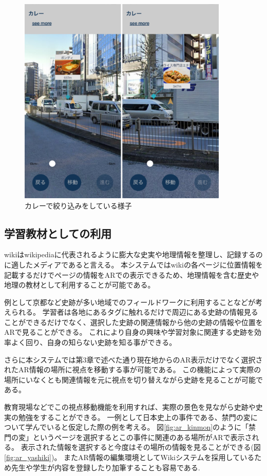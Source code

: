 \begin{figure}[h]
  \centering
  \includegraphics[width=100mm]{images/ar_navigation_jibotyo_link.png}
  \caption{カレーで絞り込みをしている様子} \label{fig:ar_navigation_jibotyo_link}
\end{figure}


\subsection{学習教材としての利用}
wikiはwikipediaに代表されるように膨大な史実や地理情報を整理し、記録するのに適したメディアであると言える。
本システムではwikiの各ページに位置情報を記載するだけでページの情報をARでの表示できるため、地理情報を含む歴史や地理の教材として利用することが可能である。

例として京都など史跡が多い地域でのフィールドワークに利用することなどが考えられる。
学習者は各地にあるタグに触れるだけで周辺にある史跡の情報見ることができるだけでなく、選択した史跡の関連情報から他の史跡の情報や位置をARで見ることができる。
これにより自身の興味や学習対象に関連する史跡を効率よく回り、自身の知らない史跡を知る事ができる。

さらに本システムでは第3章で述べた通り現在地からのAR表示だけでなく選択されたAR情報の場所に視点を移動する事が可能である。
この機能によって実際の場所にいなくとも関連情報を元に視点を切り替えながら史跡を見ることが可能である。

教育現場などでこの視点移動機能を利用すれば、実際の景色を見ながら史跡や史実の勉強をすることができる。
一例として日本史上の事件である、禁門の変について学んでいると仮定した際の例を考える。
図\ref{fig:ar_kinmon}のように「禁門の変」というページを選択するとこの事件に関連のある場所がARで表示される。
表示された情報を選択すると今度はその場所の情報を見ることができる(図\ref{fig:ar_yashiki})。
またAR情報の編集環境としてWikiシステムを採用しているため先生や学生が内容を登録したり加筆することも容易である.

